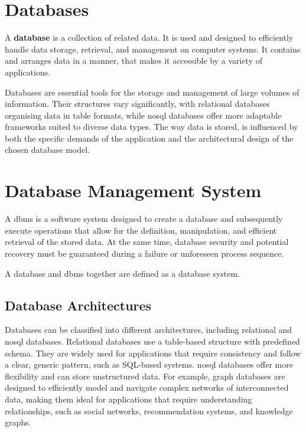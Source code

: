 \section{Databases}\label{sec:databases}
\begin{definition}\label{def:database}
    A \textbf{database} is a collection of related data\citep{limited2010introduction}. 
    It is used and designed to efficiently handle data storage, retrieval, and management on computer systems. 
    It contains and arranges data in a manner, that makes it accessible by a variety of applications.
\end{definition}
Databases are essential tools for the storage and management of large volumes of information. 
Their structures vary significantly, with relational databases organising data in table formats, while \ac{nosql} databases offer more adaptable frameworks suited to diverse data types. 
The way data is stored, is influenced by both the specific demands of the application and the architectural design of the chosen database model.
\section{Database Management System}\label{sec:Database Management System}
\begin{definition}\label{def:Database Management System}
    A \ac{dbms}  is a software system designed to create a database and subsequently execute operations that allow for the definition, manipulation, and efficient retrieval of the stored data. 
    At the same time, database security and potential recovery must be guaranteed during a failure or unforeseen process sequence. \citep{limited2010introduction}
\end{definition}
A database and \ac{dbms} together are defined as a database system.  

\subsection{Database Architectures}\label{sec:database-architectures}
Databases can be classified into different architectures, including relational and \ac{nosql} databases. 
Relational databases use a table-based structure with predefined schema. 
They are widely used for applications that require consistency and follow a clear, generic pattern, such as SQL-based systems.
\ac{nosql} databases offer more flexibility and can store unstructured data. 
For example, graph databases are designed to efficiently model and navigate complex networks of interconnected data, making them ideal for applications that require understanding relationships, such as social networks, recommendation systems, and knowledge graphs.

